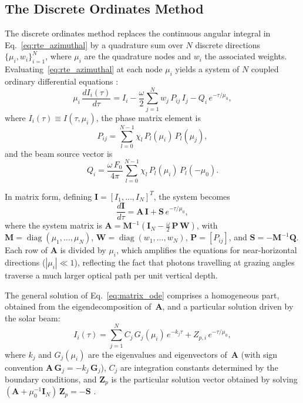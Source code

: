 \documentclass[a4paper, 11pt]{article}
\begin{document}
\subsection{The Discrete Ordinates Method}
\label{sec:disort}

The discrete ordinates method replaces the continuous angular integral
in Eq.~\eqref{eq:rte_azimuthal} by a quadrature sum over $N$ discrete
directions $\{\mu_i, w_i\}_{i=1}^{N}$, where $\mu_i$ are the
quadrature nodes and $w_i$ the associated weights.
Evaluating~\eqref{eq:rte_azimuthal} at each node $\mu_i$ yields a
system of $N$ coupled ordinary differential equations
\cite{disortreport,thomas2002}:
%
\begin{equation}
  \mu_i\,\frac{dI_i(\tau)}{d\tau}
  = I_i - \frac{\omega}{2}\sum_{j=1}^{N}w_j\,P_{ij}\,I_j
  - Q_i\,e^{-\tau/\mu_0},
  \label{eq:discrete_rte}
\end{equation}
%
where $I_i(\tau) \equiv I(\tau,\mu_i)$, the phase matrix element is
%
\begin{equation}
  P_{ij} = \sum_{l=0}^{N-1}\chi_l\,P_l(\mu_i)\,P_l(\mu_j),
  \label{eq:phase_matrix}
\end{equation}
%
and the beam source vector is
%
\begin{equation}
  Q_i = \frac{\omega\,F_0}{4\pi}\sum_{l=0}^{N-1}
  \chi_l\,P_l(\mu_i)\,P_l(-\mu_0).
  \label{eq:beam_source}
\end{equation}

In matrix form, defining $\mathbf{I} = [I_1,\ldots,I_N]^T$, the
system becomes
%
\begin{equation}
  \frac{d\mathbf{I}}{d\tau}
  = \mathbf{A}\,\mathbf{I} + \mathbf{S}\,e^{-\tau/\mu_0},
  \label{eq:matrix_ode}
\end{equation}
%
where the system matrix is
$\mathbf{A} = \mathbf{M}^{-1}(\mathbf{I}_N
- \tfrac{\omega}{2}\,\mathbf{P}\,\mathbf{W})$,
with $\mathbf{M} = \operatorname{diag}(\mu_1,\ldots,\mu_N)$,
$\mathbf{W} = \operatorname{diag}(w_1,\ldots,w_N)$,
$\mathbf{P} = [P_{ij}]$, and
$\mathbf{S} = -\mathbf{M}^{-1}\mathbf{Q}$.  Each row of
$\mathbf{A}$ is divided by $\mu_i$, which amplifies the equations for
near-horizontal directions ($|\mu_i| \ll 1$), reflecting the fact that
photons travelling at grazing angles traverse a much larger optical
path per unit vertical depth.

The general solution of Eq.~\eqref{eq:matrix_ode} comprises a
homogeneous part, obtained from the eigendecomposition of~$\mathbf{A}$,
and a particular solution driven by the solar beam:
%
\begin{equation}
  I_i(\tau) = \sum_{j=1}^{N} C_j\,G_j(\mu_i)\,e^{-k_j\tau}
  + Z_{p,i}\,e^{-\tau/\mu_0},
  \label{eq:general_solution}
\end{equation}
%
where $k_j$ and $G_j(\mu_i)$ are the eigenvalues and eigenvectors
of~$\mathbf{A}$ (with sign convention
$\mathbf{A}\,\mathbf{G}_j = -k_j\,\mathbf{G}_j$), $C_j$ are
integration constants determined by the boundary conditions, and
$\mathbf{Z}_p$ is the particular solution vector obtained by solving
$(\mathbf{A} + \mu_0^{-1}\mathbf{I}_N)\,\mathbf{Z}_p = -\mathbf{S}$
\cite{disortreport}.
\end{document}
